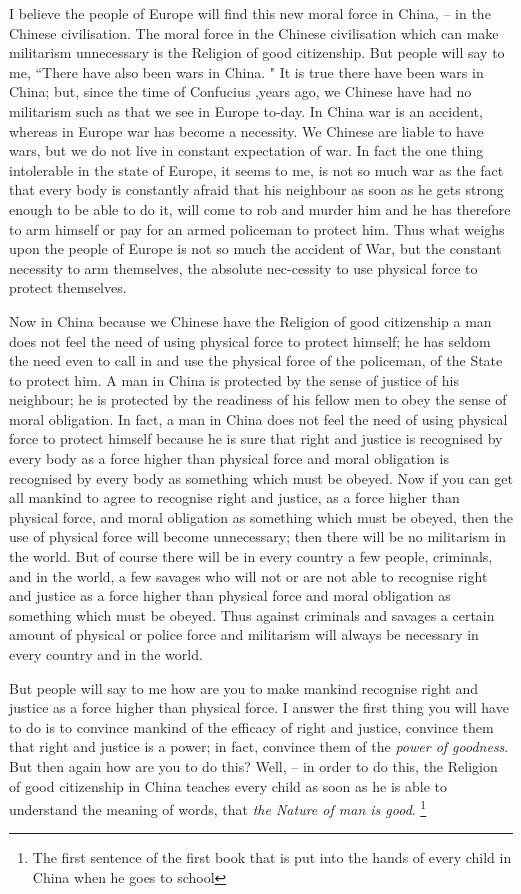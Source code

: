 I believe the people of Europe will find this new moral force in China, -- in the Chinese civilisation.
The moral force in the Chinese civilisation which can make militarism unnecessary is the Religion of good citizenship.
But people will say to me, ``There have also been wars in China. " It is true there have been wars in China;
but, since the time of Confucius ,years ago, we Chinese have had no militarism such as that we see in Europe to-day.
In China war is an accident, whereas in Europe war has become a necessity. We Chinese are liable to have wars, but we do not live in constant expectation of war.
In fact the one thing intolerable in the state of Europe,
it seems to me, is not so much war as the fact that every body is constantly afraid that his neighbour as soon as he gets strong enough to be able to do it,
will come to rob and murder him and he has therefore to arm himself or pay for an armed policeman to protect him.
Thus what weighs upon the people of Europe is not so much the accident of War,
but the constant necessity to arm themselves,
the absolute nec-cessity to use physical force to protect themselves.

Now in China because we Chinese have the Religion of good citizenship a man does not feel the need of using physical force to protect himself;
he has seldom the need even to call in and use the physical force of the policeman, of the State to protect him.
A man in China is protected by the sense of justice of his neighbour; he is protected by the readiness of his fellow men to obey the sense of moral obligation.
In fact, a man in China does not feel the need of using physical force to protect himself because he is sure that right and justice is recognised by every body as a force higher than physical force and moral obligation is recognised by every body as something which must be obeyed.
Now if you can get all mankind to agree to recognise right and justice, as a force higher than physical force, and moral obligation as something which must be obeyed, then the use of physical force will become unnecessary; then there will be no militarism in the world.
But of course there will be in every country a few people, criminals, and in the world, a few savages who will not or are not able to recognise right and justice as a force higher than physical force and moral obligation as something which must be obeyed.
Thus against criminals and savages a certain amount of physical or police force and militarism will always be necessary in every country and in the world.

But people will say to me how are you to make mankind recognise right and justice as a force higher than physical force. I answer the first thing you will have to do is to convince mankind of the efficacy of right and justice, convince them that right and justice is a power; in fact, convince them of the \emph{power of goodness}. But then again how are you to do this? Well, -- in order to do this, the Religion of good citizenship in China teaches every child as soon as he is able to understand the meaning of words, that \emph{the Nature of man is good}.
\footnote{The first sentence of the first book that is put into the hands of every child in China when he goes to school}

